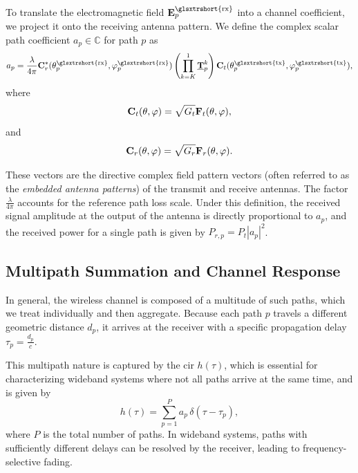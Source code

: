 To translate the electromagnetic field $\bsup{E}_p^{\text{\glsxtrshort{rx}}}$ into a channel coefficient, we project it onto the receiving antenna pattern. We define the complex scalar path coefficient $a_p \in \mathbb{C}$ for path $p$ as
\begin{equation}\labeq{path-coefficient-siso}
  a_p = \frac{\lambda}{4\pi} \bsup{C}_r^*(\theta_p^{\text{\glsxtrshort{rx}}}, \varphi_p^{\text{\glsxtrshort{rx}}}) \left( \prod_{k=K}^1 \dyadic{T}_p^k \right) \bsup{C}_t(\theta_p^{\text{\glsxtrshort{tx}}}, \varphi_p^{\text{\glsxtrshort{tx}}}),
\end{equation}
where
\begin{equation}
  \mathbf{C}_t(\theta, \varphi) = \sqrt{G_t} \mathbf{F}_t(\theta, \varphi),
\end{equation}
and
\begin{equation}
  \mathbf{C}_r(\theta, \varphi) = \sqrt{G_r} \mathbf{F}_r(\theta, \varphi).
\end{equation}

These vectors are the directive complex field pattern vectors (often referred to as the \emph{embedded antenna patterns}) of the transmit and receive antennas. The factor $\tfrac{\lambda}{4\pi}$ accounts for the reference  path loss scale. Under this definition, the received signal amplitude at the output of the antenna is directly proportional to $a_p$, and the received power for a single path is given by $P_{r,p} = P_t |a_p|^2$.

\subsection{Multipath Summation and Channel Response}

In general, the wireless channel is composed of a multitude of such paths, which we treat individually and then aggregate. Because each path $p$ travels a different geometric distance $d_p$, it arrives at the receiver with a specific propagation delay $\tau_p = \tfrac{d_p}{c}$.

This multipath nature is captured by the \gls{cir} $h(\tau)$, which is essential for characterizing wideband systems where not all paths arrive at the same time, and is given by
\begin{equation}
  h(\tau) = \sum_{p=1}^{P} a_p \, \delta(\tau - \tau_p),
\end{equation}
where $P$ is the total number of paths. In wideband systems, paths with sufficiently different delays can be resolved by the receiver, leading to frequency-selective fading.

